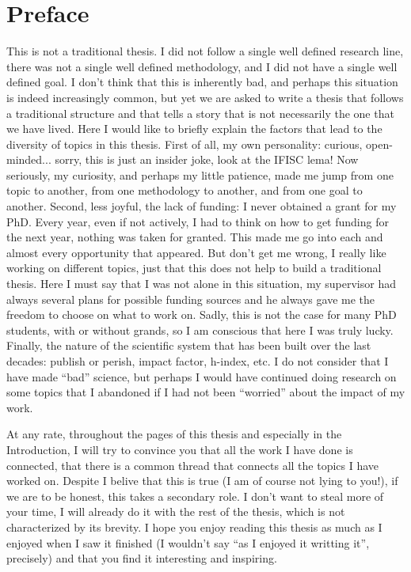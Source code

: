 \pagebreak
\thispagestyle{empty}
\section*{Preface}

This is not a traditional thesis. I did not follow a single well defined
research line, there was not a single well defined methodology, and I did not
have a single well defined goal. I don't think that this is inherently bad, and
perhaps this situation is indeed increasingly common, but yet we are asked to
write a thesis that follows a traditional structure and that tells a story that
is not necessarily the one that we have lived. Here I would like to briefly
explain the factors that lead to the diversity of topics in this thesis. First
of all, my own personality: curious, open-minded... sorry, this is just an
insider joke, look at the IFISC lema! Now seriously, my curiosity, and perhaps
my little patience, made me jump from one topic to another, from one
methodology to another, and from one goal to another. Second, less joyful,
the lack of funding: I never obtained a grant for my PhD. Every year, even if
not actively, I had to think on how to get funding for the next year, nothing
was taken for granted. This made me go into each and almost every opportunity
that appeared. But don't get me wrong, I really like working on different
topics, just that this does not help to build a traditional thesis. Here I must
say that I was not alone in this situation, my supervisor had always several
plans for possible funding sources and he always gave me the freedom to choose
on what to work on. Sadly, this is not the case for many PhD students, with or
without grands, so I am conscious that here I was truly lucky. Finally, the
nature of the scientific system that has been built over the last decades:
publish or perish, impact factor, h-index, etc. I do not consider that I
have made ``bad'' science, but perhaps I would have continued doing research on
some topics that I abandoned if I had not been ``worried'' about the impact of
my work.

At any rate, throughout the pages of this thesis and especially in the
Introduction, I will try to convince you that all the work I have done is
connected, that there is a common thread that connects all the topics I have
worked on. Despite I belive that this is true (I am of course not lying to
you!), if we are to be honest, this takes a secondary role. I don't want to
steal more of your time, I will already do it with the rest of the thesis,
which is not characterized by its brevity. I hope you enjoy reading this
thesis as much as I enjoyed when I saw it finished (I wouldn't say ``as I
enjoyed it writting it'', precisely) and that you find it interesting and
inspiring.


\vfill